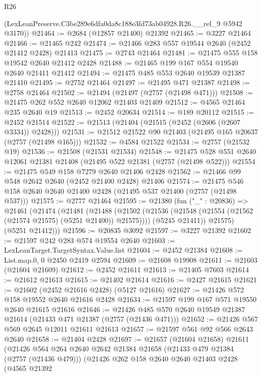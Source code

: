 \begin{lexlean}{R26}
\begin{coremodule}
      (LexLeanPreserve.C3be289e6dfa0da8c188e3fd73ab04928.R26.__rel_9 @5942 @3170))
@21464 := @2684 (@12857 @21400) @21392
@21465 := @3227 @21464
@21466 := @21465 @242
@21474 := @21466 @283 @557 @19544 @2640 (@2452 @21412 @2428) @21413
@21475 := @2743 @21464
@21481 := @21475 @555 @158 @19542 @2640 @21412 @2428
@21488 := @21465 @199 @167 @554 @19540 @2640 @21411 @21412
@21494 := @21475 @485 @553 @2640 @19539 @21387 @21410
@21495 := @2752 @21464
@21497 := @21495 @471 @21387
@21498 := @2758 @21464
@21502 := @21494 (@21497 (@2757 (@21498 @471)))
@21508 := @21475 @262 @552 @2640 @12062 @21403 @21409
@21512 := @4565 @21464 @235 @2640 @19
@21513 := @2452 @20634
@21514 := @189 @20112
@21515 := @2452 @21514
@21522 := @21513 (@21404 (@21515 (@2452 (@2606 (@2607 @3334)) @2428)))
@21531 := @21512 @21522 @90 @21403 (@21495 @165 @20637 (@2757 (@21498 @165)))
@21532 := @4584 @21522
@21534 := @2757 (@21532 @19)
@21536 := @21508 (@21531 @21534)
@21548 := @21475 @528 @551 @2640 @12061 @21381 @21408 (@21495 @522 @21381 (@2757 (@21498 @522)))
@21554 := @21475 @549 @158 @7279 @2640 @21406 @2428
@21562 := @21466 @99 @548 @2642 @2640 (@2452 @21400 @2428) @21406
@21574 := @21475 @546 @158 @2640 @2640 @21400 @2428 (@21495 @537 @21400 (@2757 (@21498 @537)))
@21575 := @2777 @21464
@21595 := @21380
    (fun ("_" : @20836) =>
    @21461
      (@21474
        (@21481
          (@21488
            (@21502 (@21536 (@21548 (@21554 (@21562 (@21574 @21575) (@5251 @21400)) @21575))))
            (@5245 @21411))
          @21575)
        (@5251 @21412)))
@21596 := @20835 @3092
@21597 := @3227 @21392
@21602 := @21597 @242 @283 @574 @19554 @2640
@21603 := LexLeanTarget.TargetSyntax.Value.list
@21604 := @2452 @21384
@21608 := List.map.{0, 0} @2450 @2419 @2594
@21609 := @21608 @19908
@21611 := @21603 (@21604 @21609)
@21612 := @2452 @21611
@21613 := @21405 @7603
@21614 := @21612 @21613
@21615 := @21402 @21614
@21616 := @2427 @21615
@21621 := @21602 (@2452 @21616 @2428) (@5127 @21616)
@21627 := @21426 @572 @158 @19552 @2640 @21616 @2428
@21634 := @21597 @199 @167 @571 @19550 @2640 @21615 @21616
@21646 := @21426 @485 @570 @2640 @19549 @21387 @21614 (@21433 @471 @21387 (@2757 (@21436 @471)))
@21652 := @21426 @567 @569 @2645 @12011 @21611 @21613
@21657 := @21597 @561 @92 @566 @2643 @2640
@21658 := @21404 @2428
@21697 := @21657
    (@21604 @21658)
    @21611
    (@21426
      @564
      @264
      @2640
      @2642
      @21384
      @21658
      (@21433 @479 @21384 (@2757 (@21436 @479)))
      (@21426
        @262
        @158
        @2640
        @2640
        @21403
        @2428
        (@4565
          @21392

\end{coremodule}
\end{lexlean}
